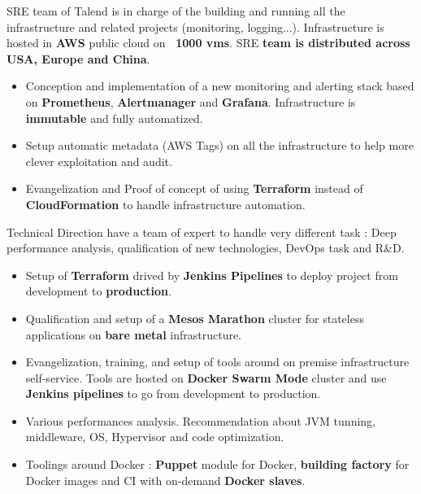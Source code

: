 \documentclass[10pt,a4paper,ragged2e]{altacv}
\begin{document}

		SRE team of Talend is in charge of the building and running all the infrastructure and related projects (monitoring, logging...). Infrastructure is hosted in \textbf{AWS} public cloud on\textbf{ ~1000 vms}. SRE \textbf{team is distributed across USA, Europe and China}.
	
		\medskip
		\begin{itemize}
			\item Conception and implementation of a new monitoring and alerting stack based on \textbf{Prometheus}, \textbf{Alertmanager} and \textbf{Grafana}. Infrastructure is \textbf{immutable} and fully automatized.
			\item Setup automatic metadata (AWS Tags) on all the infrastructure to help more clever exploitation and audit.
			\item Evangelization and Proof of concept of using \textbf{Terraform} instead of \textbf{CloudFormation} to handle infrastructure automation.
		\end{itemize}
	\divider

	
		Technical Direction have a team of expert to handle very different task : Deep performance analysis, qualification of new technologies, DevOps task and R\&D.
		
		\medskip
		\begin{itemize}
			\item Setup of \textbf{Terraform} drived by \textbf{Jenkins Pipelines} to deploy project from development to \textbf{production}.
			\item Qualification and setup of a\textbf{ Mesos Marathon} cluster for stateless applications on \textbf{bare metal} infrastructure.
			\item Evangelization, training, and setup of tools around on premise infrastructure self-service. Tools are hosted on \textbf{Docker Swarm Mode} cluster and use \textbf{Jenkins pipelines} to go from development to production.
			\item Various performances analysis. Recommendation about JVM tunning, middleware, OS, Hypervisor and code optimization.
			\item Toolings around Docker : \textbf{Puppet} module for Docker, \textbf{building factory} for Docker images and CI with on-demand \textbf{Docker slaves}.
		\end{itemize}
	\divider
\end{document}
